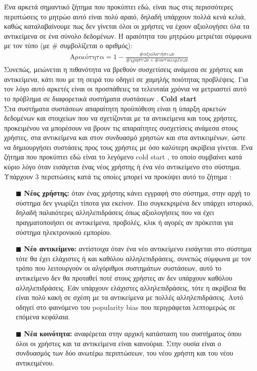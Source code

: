 Ένα αρκετά σημαντικό ζήτημα που προκύπτει εδώ, είναι πως στις περισσότερες περιπτώσεις το μητρώο αυτό είναι πολύ αραιό, δηλαδή υπάρχουν πολλά κενά κελιά, καθώς καταλαβαίνουμε πως δεν γίνεται όλοι οι χρήστες να έχουν αξιολογήσει όλα τα αντικείμενα σε ένα σύνολο δεδομένων. Η αραιότητα του μητρώου μετριέται σύμφωνα με τον τύπο (με \# συμβολίζεται ο αριθμός):
 \begin{align*}
 	\text{Αραιότητα} = 1 - \frac{\# \text{αξιολογήσεων}}{\# \text{χρηστών} \times \# \text{αντικειμένων}}
 \end{align*}
Συνεπώς, μειώνεται η πιθανότητα να βρεθούν συσχετίσεις ανάμεσα σε χρήστες και αντικείμενα, κάτι που με τη σειρά του οδηγεί σε χαμηλής ποιότητας προβλέψεις. Για τον λόγο αυτό αρκετές είναι οι προσπάθειες τα τελευταία χρόνια να μετριαστεί αυτό το πρόβλημα σε διαφορετικά συστήματα συστάσεων \cite{idrissiSystematicLiteratureReview2020}.
\newpage
 \noindent \textbf{Cold start}\\
 Στα συστήματα συστάσεων απαραίτητη προϋπόθεση είναι η ύπαρξη αρκετών δεδομένων και στοιχείων που να σχετίζονται με τα αντικείμενα και τους χρήστες, προκειμένου να μπορέσουν να βρουν τις απαραίτητες συσχετίσεις ανάμεσα στους χρήστες, στα αντικείμενα και στον συνδυασμό χρηστών και στα αντικειμένων, ώστε να δημιουργήσει συστάσεις προς τους χρήστες με όσο καλύτερη ακρίβεια γίνεται. Ένα ζήτημα που προκύπτει εδώ είναι το λεγόμενο cold start \cite{scheinMethodsMetricsColdstart2002}, το οποίο συμβαίνει κατά κύριο λόγο όταν εισάγεται ένας νέος χρήστης ή ένα νέο αντικείμενο στο σύστημα. Υπάρχουν 3 περιπτώσεις κατά τις οποίες μπορεί να προκύψει αυτό το ζήτημα \cite{brusilovskyAdaptiveWebMethods2007}:
\begin{itemize}
	\item[$\blacksquare$] \textbf{Νέος χρήστης:} όταν ένας χρήστης κάνει εγγραφή στο σύστημα, στην αρχή το σύστημα δεν γνωρίζει τίποτα για εκείνον. Πιο συγκεκριμένα δεν υπάρχει ιστορικό, δηλαδή παλαιότερες αλληλεπιδράσεις όπως αξιολογήσεις που να έχει πραγματοποιήσει σε αντικείμενα, προβολές, κλικ ή αγορές αν πρόκειται για σύστημα ηλεκτρονικού εμπορίου.
	\item[$\blacksquare$] \textbf{Νέο αντικείμενο:} αντίστοιχα όταν ένα νέο αντικείμενο εισάγεται στο σύστημα τότε θα έχει ελάχιστες ή και καθόλου αλληλεπιδράσεις, συνεπώς σύμφωνα με τον τρόπο που λειτουργούν οι αλγόριθμοι συστημάτων συστάσεων, αυτό το αντικείμενο δεν θα προταθεί ποτέ στους χρήστες αν δεν υπάρχουν καθόλου αλληλεπιδράσεις. Εάν υπάρχουν ελάχιστες αλληλεπιδράσεις, τότε η ακρίβεια θα είναι πολύ κακή σε σχέση με τα αντικείμενα με πολλές αλληλεπιδράσεις. Αυτό οδηγεί στο φαινόμενο του popularity bias που περιγράφεται λεπτομερώς σε επόμενα κεφάλαια.
	\item[$\blacksquare$] \textbf{Νέα κοινότητα:} αναφέρεται στην αρχική κατάσταση του συστήματος όπου όλοι οι χρήστες και τα αντικείμενα είναι καινούρια. Στην ουσία είναι ο συνδυασμός των δύο ανωτέρω περιπτώσεων, του νέου χρήστη και του νέου αντικειμένου.
\end{itemize} 
